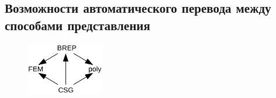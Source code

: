 


%                                                                             

\subsection{Возможности автоматического перевода между способами представления}\label{sec:secAutoConversion}


\begin{figure}[H]
\centering
\includegraphics[width=0.3\textwidth]{pictures/Conversions.png}
\caption{}
\label{fig:Conversions}
\end{figure}


